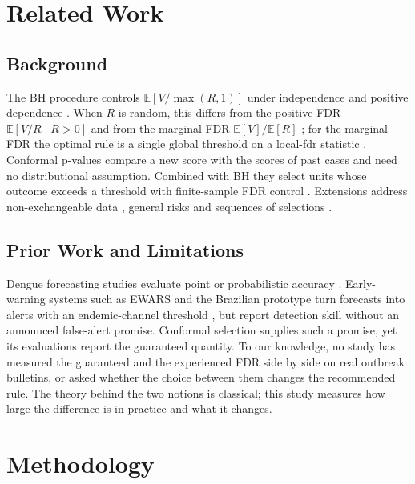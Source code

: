 \documentclass[conference]{IEEEtran}
\begin{document}
\section{Related Work}

\subsection{Background}
The BH procedure \cite{benjamini1995} controls $\mathbb{E}[V/\max(R,1)]$ under independence and positive dependence \cite{benjamini2001}. When $R$ is random, this differs from the positive FDR $\mathbb{E}[V/R\mid R>0]$ \cite{storey2003} and from the marginal FDR $\mathbb{E}[V]/\mathbb{E}[R]$ \cite{genovese2002}; for the marginal FDR the optimal rule is a single global threshold on a local-fdr statistic \cite{sun2007}. Conformal p-values \cite{vovk2005,bates2023} compare a new score with the scores of past cases and need no distributional assumption. Combined with BH they select units whose outcome exceeds a threshold with finite-sample FDR control \cite{jin2023selection}. Extensions address non-exchangeable data \cite{barber2023,gibbs2021}, general risks \cite{angelopoulos2024crc,angelopoulos2021ltt} and sequences of selections \cite{javanmard2018,zrnic2020}.

\subsection{Prior Work and Limitations}
Dengue forecasting studies evaluate point or probabilistic accuracy \cite{johansson2019,colon2021vietnam,bracher2021}. Early-warning systems such as EWARS \cite{hussain2018ewars} and the Brazilian prototype \cite{lowe2016} turn forecasts into alerts with an endemic-channel threshold \cite{bortman1999}, but report detection skill without an announced false-alert promise. Conformal selection supplies such a promise, yet its evaluations report the guaranteed quantity. To our knowledge, no study has measured the guaranteed and the experienced FDR side by side on real outbreak bulletins, or asked whether the choice between them changes the recommended rule. The theory behind the two notions is classical; this study measures how large the difference is in practice and what it changes.

\section{Methodology}
\end{document}
